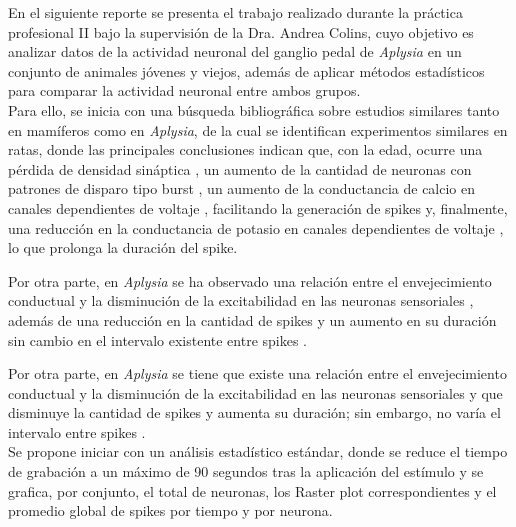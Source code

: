 %
%



En el siguiente reporte se presenta el trabajo realizado durante la práctica profesional II bajo la supervisión de la Dra. Andrea Colins, cuyo objetivo es analizar datos de la actividad neuronal del ganglio pedal de \textit{Aplysia} en un conjunto de animales jóvenes y viejos, además de aplicar métodos estadísticos para comparar la actividad neuronal entre ambos grupos.\\

 Para ello, se inicia con una búsqueda bibliográfica sobre estudios similares tanto en mamíferos como en \textit{Aplysia}, de la cual se identifican experimentos similares en ratas, donde las principales conclusiones indican que, con la edad, ocurre una pérdida de densidad sináptica \cite{bib perdida sinaptica}, un aumento de la cantidad de neuronas con patrones de disparo tipo burst \cite{bib burst}, un aumento de la conductancia de calcio en canales dependientes de voltaje \cite{bib Ca}, facilitando la generación de spikes y, finalmente, una reducción en la conductancia de potasio en canales dependientes de voltaje \cite{bib Potasio}, lo que prolonga la duración del spike.

Por otra parte, en \textit{Aplysia} se ha observado una relación entre el envejecimiento conductual y la disminución de la excitabilidad en las neuronas sensoriales \cite{bib sensoriales}, además de una reducción en la cantidad de spikes y un aumento en su duración sin cambio en el intervalo existente entre spikes \cite{bib cantidad}.

Por otra parte, en \textit{Aplysia} se tiene que existe una relación entre el envejecimiento conductual y la disminución de la excitabilidad en las neuronas sensoriales \cite{bib sensoriales} y que disminuye la cantidad de spikes y aumenta su duración; sin embargo, no varía el intervalo entre spikes \cite{bib cantidad}. \\

Se propone iniciar con un análisis estadístico estándar, donde se reduce el tiempo de grabación a un máximo de 90 segundos tras la aplicación del estímulo y se grafica, por conjunto, el total de neuronas, los Raster plot correspondientes y el promedio global de spikes por tiempo y por neurona.\\

